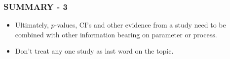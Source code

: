 \documentclass[10pt,handout]{beamer}\usepackage[]{graphicx}\usepackage[]{color}
\begin{document}
\begin{frame}
	\frametitle{SUMMARY - 3}
	\begin{itemize}
		\item
		Ultimately, $p$-values, CI's and other evidence from a study need to be combined with other information bearing on  parameter or process. \newline
		\item
		Don't treat any one study as last word on the topic. \newline
	\end{itemize}
\end{frame}
\end{document}
